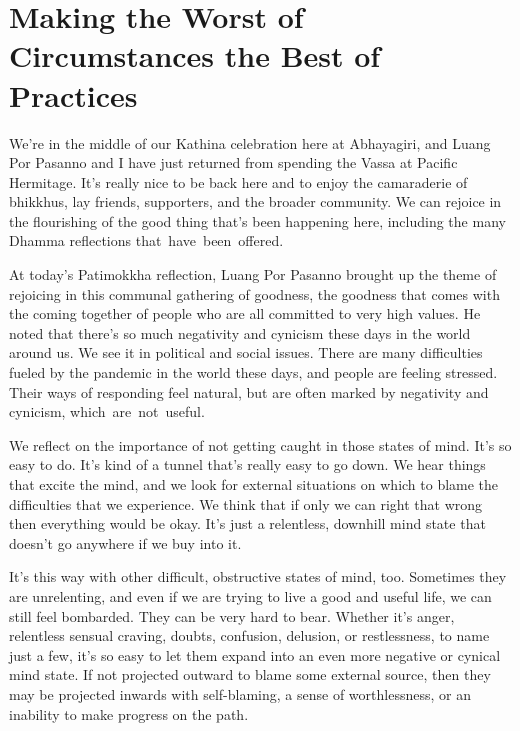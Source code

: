 
{\centering
\chapter{Making the Worst of Circumstances the Best of Practices}
\par}

We're in the middle of our Kathina celebration here at Abhayagiri, and Luang Por Pasanno and I have just returned from spending the Vassa at Pacific Hermitage. It's really nice to be back here and to enjoy the camaraderie of bhikkhus, lay friends, supporters, and the broader community. We can rejoice in the flourishing of the good thing that's been happening here, including the many Dhamma reflections \mbox{that have been offered}.

At today's Patimokkha reflection, Luang Por Pasanno brought up the theme of rejoicing in this communal gathering of goodness, the goodness that comes with the coming together of people who are all committed to very high values. He noted that there's so much negativity and cynicism these days in the world around us. We see it in political and social issues. There are many difficulties fueled by the pandemic in the world these days, and people are feeling stressed. Their ways of responding feel natural, but are often marked by negativity and cynicism, \mbox{which are not useful}.

We reflect on the importance of not getting caught in those states of mind. It's so easy to do. It's kind of a tunnel that's really easy to go down. We hear things that excite the mind, and we look for external situations on which to blame the difficulties that we experience. We think that if only we can right that wrong then everything would be okay. It's just a relentless, downhill mind state that doesn't go anywhere if we buy into it.

It's this way with other difficult, obstructive states of mind, too. Sometimes they are unrelenting, and even if we are trying to live a good and useful life, we can still feel bombarded. They can be very hard to bear. Whether it's anger, relentless sensual craving, doubts, confusion, delusion, or restlessness, to name just a few, it's so easy to let them expand into an even more negative or cynical mind state. If not projected outward to blame some external source, then they may be projected inwards with self-blaming, a sense of worthlessness, or an inability to make progress on the path.


